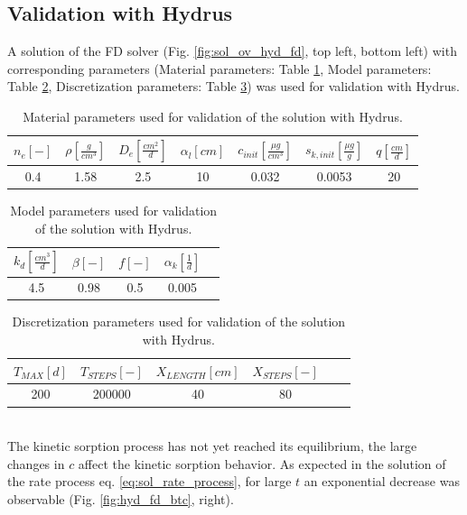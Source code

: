 \subsection{Validation with Hydrus}
A solution of the FD solver (Fig. \ref{fig:sol_ov_hyd_fd}, top left, bottom left) with corresponding parameters (Material parameters: Table \ref{tab:mat_hyd}, Model parameters: Table \ref{tab:mod_hyd}, Discretization parameters: Table \ref{tab:disc_hyd}) was used for validation with Hydrus.
\begin{table}[h!]
    \centering
    \begin{tabular}{ccccccc}
         $n_{e} \left[-\right]$ & $\rho \left[\frac{g}{cm^3}\right]$ & $D_e \left[\frac{cm^2}{d}\right]$ & $\alpha_l \left[cm\right]$ & $c_{init} \left[\frac{\mu g}{cm^3}\right]$ & $s_{k, init} \left[\frac{\mu g}{g}\right]$ & $q \left[\frac{cm}{d}\right]$  \\ [0.2 cm] \hline
         0.4 & 1.58 & 2.5 & 10 & 0.032 & 0.0053 & 20 \\
    \end{tabular}
    \caption{Material parameters used for validation of the solution with Hydrus.}
    \label{tab:mat_hyd}
\end{table}
\begin{table}[h!]
    \centering
\begin{tabular}{ccccc}
     $k_d \left[\frac{cm^3}{d}\right]$ & $\beta \left[-\right]$ & $f \left[-\right]$ & $\alpha_k \left[\frac{1}{d}\right]$ \\ [0.2 cm] \hline
     4.5 & 0.98 & 0.5 & 0.005
\end{tabular}
    \caption{Model parameters used for validation of the solution with Hydrus.}
    \label{tab:mod_hyd}
\end{table}
\begin{table}[h!]
    \centering
    \begin{tabular}{cccccc}
      $T_{MAX} \left[d\right]$ & $T_{STEPS} \left[-\right]$ & $X_{LENGTH} \left[cm\right]$ & $X_{STEPS} \left[-\right]$ \\ [0.2 cm] \hline
      200 & 200000 & 40 & 80
\end{tabular}
    \caption{Discretization parameters used for validation of the solution with Hydrus.}
    \label{tab:disc_hyd}
\end{table}\\
The kinetic sorption process has not yet reached its equilibrium, the large changes in $c$ affect the kinetic sorption behavior. As expected in the solution of the rate process eq. \ref{eq:sol_rate_process}, for large $t$ an exponential decrease was observable (Fig. \ref{fig:hyd_fd_btc}, right).\\
